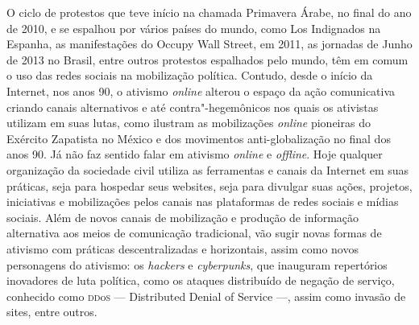 
O ciclo de protestos que teve início na chamada Primavera Árabe, no
final do ano de 2010, e se espalhou por vários países do mundo, como Los
Indignados na Espanha, as manifestações do Occupy Wall Street, em 2011,
as jornadas de Junho de 2013 no Brasil, entre outros protestos
espalhados pelo mundo, têm em comum o uso das redes sociais na
mobilização política. Contudo, desde o início da Internet, nos anos 90,
o ativismo \textit{online} alterou o espaço da ação comunicativa criando canais
alternativos e até contra"-hegemônicos nos quais os ativistas utilizam em
suas lutas, como ilustram as mobilizações \textit{online} pioneiras do Exército
Zapatista no México e dos movimentos anti-globalização no final dos
anos 90. Já não faz sentido falar em ativismo \textit{online} e \textit{offline}. Hoje
qualquer organização da sociedade civil utiliza as ferramentas e canais
da Internet em suas práticas, seja para hospedar seus websites, seja
para divulgar suas ações, projetos, iniciativas e mobilizações pelos
canais nas plataformas de redes sociais e mídias sociais. Além de novos
canais de mobilização e produção de informação alternativa aos meios de
comunicação tradicional, vão sugir novas formas de ativismo com práticas
descentralizadas e horizontais, assim como novos personagens do
ativismo: os \textit{hackers} e \textit{cyberpunks}, que inauguram repertórios inovadores
de luta política, como os ataques distribuído de negação de serviço,
conhecido como \textsc{dd}o\textsc{s} --- Distributed Denial of Service ---, assim
como invasão de sites, entre outros.

